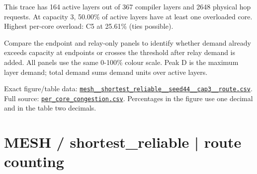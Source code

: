 \documentclass[10pt,a4paper]{article}
\begin{document}
This trace has 164 active layers out of 367 compiler layers and 2648 physical hop requests. At capacity 3, 50.00\% of active layers have at least one overloaded core. Highest per-core overload: C5 at 25.61\% (ties possible).\par
Compare the endpoint and relay-only panels to identify whether demand already exceeds capacity at endpoints or crosses the threshold after relay demand is added. All panels use the same 0-100\% colour scale. Peak D is the maximum layer demand; total demand sums demand units over active layers.\par
Exact figure/table data: \href{\detokenize{file:///home/dhruv-pansuriya/Documents/BTP/Compiler-Driven-ACE/output/pdf/qaoa_methods_congestion/tables/mesh__shortest_reliable__seed44__cap3__route.csv}}{\nolinkurl{mesh__shortest_reliable__seed44__cap3__route.csv}}. Full source: \href{\detokenize{file:///home/dhruv-pansuriya/Documents/BTP/Compiler-Driven-ACE/results/qaoa_2seed_2026-10-26/congestion/per_core_congestion.csv}}{\nolinkurl{per_core_congestion.csv}}. Percentages in the figure use one decimal and in the table two decimals.\par
\clearpage
\section*{MESH / shortest\_reliable | route counting}
\end{document}
